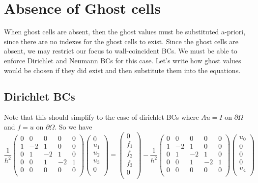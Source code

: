 \documentclass[11pt]{article}
\begin{document}
\section{Absence of Ghost cells}
When ghost cells are absent, then the ghost values must be substituted a-priori, since there are no indexes for the ghost cells to exist. Since the ghost cells are absent, we may restrict our focus to wall-coincident BCs. We must be able to enforce Dirichlet and Neumann BCs for this case. Let's write how ghost values would be chosen if they did exist and then substitute them into the equations.

\subsection{Dirichlet BCs}
Note that this should simplify to the case of dirichlet BCs where $Au=I$ on $\partial \Omega$ and $f = u$ on $\partial \Omega$. So we have
\begin{equation}
\frac{1}{h^2}
 \begin{pmatrix}
  0 &  0 &  0 &  0 &  0 \\
  1 & -2 &  1 &  0 &  0 \\
  0 &  1 & -2 &  1 &  0 \\
  0 &  0 &  1 & -2 &  1 \\
  0 &  0 &  0 &  0 &  0 \\
 \end{pmatrix}
 \begin{pmatrix}
  0 \\  u_1 \\  u_2 \\  u_3 \\  0 \\
 \end{pmatrix}
  = 
 \begin{pmatrix}
  0 \\  f_1 \\  f_2 \\  f_3 \\  0 \\
 \end{pmatrix}
   -
\frac{1}{h^2}
 \begin{pmatrix}
  0 &  0 &  0 &  0 &  0 \\
  1 & -2 &  1 &  0 &  0 \\
  0 &  1 & -2 &  1 &  0 \\
  0 &  0 &  1 & -2 &  1 \\
  0 &  0 &  0 &  0 &  0 \\
 \end{pmatrix}
 \begin{pmatrix}
  u_0 \\  0 \\  0 \\  0 \\  u_4 \\
 \end{pmatrix}
\end{equation}
\end{document}
